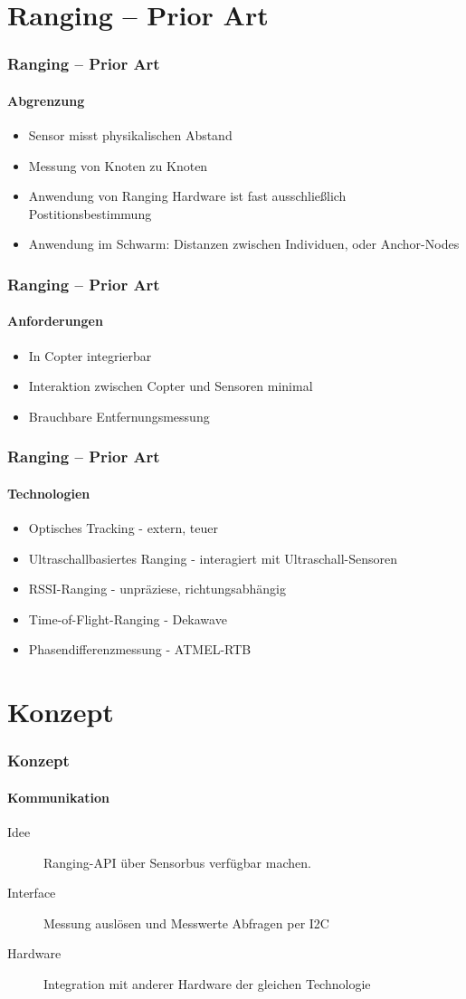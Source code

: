 \documentclass{beamer}
\begin{document}
\section{Ranging – Prior Art}
\begin{frame}
	\frametitle{Ranging – Prior Art}
	\framesubtitle{Abgrenzung}
	\begin{itemize}
		\item Sensor misst physikalischen Abstand
		\item Messung von Knoten zu Knoten
		\item Anwendung von Ranging Hardware ist fast ausschließlich Postitionsbestimmung
		\item Anwendung im Schwarm: Distanzen zwischen Individuen, oder Anchor-Nodes
	\end{itemize}
\end{frame}

\begin{frame}
	\frametitle{Ranging – Prior Art}
	\framesubtitle{Anforderungen}
	\begin{itemize}
		\item In Copter integrierbar 
		\item Interaktion zwischen Copter und Sensoren minimal
		\item Brauchbare Entfernungsmessung
	\end{itemize}
\end{frame}

\begin{frame}
	\frametitle{Ranging – Prior Art}
	\framesubtitle{Technologien}
	\begin{itemize}
		\item Optisches Tracking - extern, teuer
		\item Ultraschallbasiertes Ranging - interagiert mit Ultraschall-Sensoren
		\item RSSI-Ranging - unpräziese, richtungsabhängig
	\end{itemize}
	\begin{itemize}
		\item Time-of-Flight-Ranging - Dekawave
		\item Phasendifferenzmessung - ATMEL-RTB
	\end{itemize}
\end{frame}

\section{Konzept}
\begin{frame}
	\frametitle{Konzept}
	\framesubtitle{Kommunikation}
	
\begin{description}
	\item[ Idee ] Ranging-API über Sensorbus verfügbar machen.
	\item[ Interface ] Messung auslösen und Messwerte Abfragen per I2C
	\item[ Hardware ] Integration mit anderer Hardware der gleichen Technologie
\end{description}
\end{frame}
\end{document}
